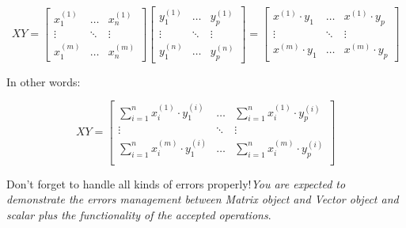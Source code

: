 $$
X  Y = 
\begin{bmatrix} 
x_{1}^{(1)} & \dots & x_{n}^{(1)}  \\ 
\vdots & \ddots & \vdots \\ 
x_{1}^{(m)} & \dots & x_{n}^{(m)} 
\end{bmatrix}  
\begin{bmatrix} 
y_{1}^{(1)} & \dots & y_{p}^{(1)}  \\ 
\vdots & \ddots & \vdots \\ 
y_{1}^{(n)} & \dots & y_{p}^{(n)} 
\end{bmatrix} = 
\begin{bmatrix} 
x^{(1)} \cdot y_1  & \dots & x^{(1)} \cdot y_{p} \\ 
\vdots & \ddots & \vdots \\ 
x^{(m)} \cdot y_1 & \dots & x^{(m)} \cdot y_{p}
\end{bmatrix}
$$

In other words:

$$
X Y = 
\begin{bmatrix} 
\sum_{i = 1}^{n} x_{i}^{(1)} \cdot y_{1}^{(i)} & \dots & \sum_{i=1}^{n} x_{i}^{(1)} \cdot y_{p}^{(i)} \\
\vdots & \ddots & \vdots \\ 
\sum_{i = 1}^{n} x_{i}^{(m)} \cdot y_{1}^{(i)} & \dots & \sum_{i=1}^{n} x_{i}^{(m)} \cdot y_{p}^{(i)} \\
\end{bmatrix}
$$  

Don't forget to handle all kinds of errors properly!\textit{You are expected to demonstrate the errors management between
Matrix object and Vector object and scalar plus the functionality of the accepted operations}. 